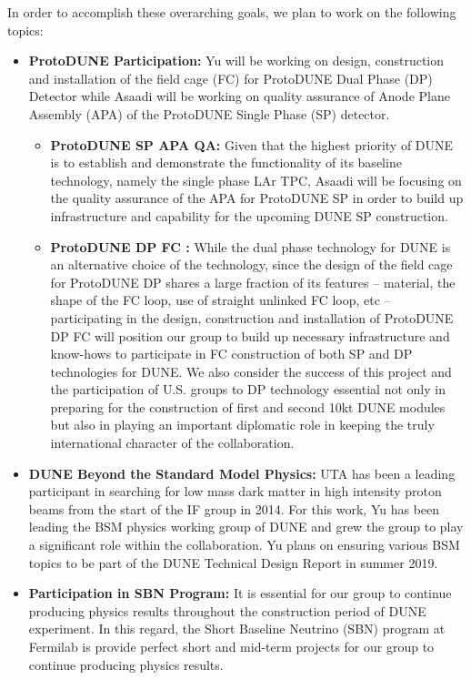In order to accomplish these overarching goals, we plan to work on the following topics:
\begin{itemize}
\item {{\bf ProtoDUNE Participation:} Yu will be working on design, construction and installation of the field cage (FC) for ProtoDUNE Dual Phase (DP) Detector while Asaadi will be working on quality assurance of Anode Plane Assembly (APA) of the ProtoDUNE Single Phase (SP) detector.} 
\begin{itemize}
\item {{\bf ProtoDUNE SP APA QA:} Given that the highest priority of DUNE is to establish and demonstrate the functionality of its baseline technology, namely the single phase LAr TPC, Asaadi will be focusing on the quality assurance of the APA for ProtoDUNE SP in order to build up infrastructure and capability for the upcoming DUNE SP construction.}
\item {{\bf ProtoDUNE DP FC :} While the dual phase technology for DUNE is an alternative choice of the technology, since the design of the field cage for ProtoDUNE DP shares a large fraction of its features – material, the shape of the FC loop, use of straight unlinked FC loop, etc – participating in the design, construction and installation of ProtoDUNE DP FC will position our group to build up necessary infrastructure and know-hows to participate in FC construction of both SP and DP technologies for DUNE.  We also consider the success of this project and the participation of U.S. groups to DP technology essential not only in preparing for the construction of first and second 10kt DUNE modules but also in playing an important diplomatic role in keeping the truly international character of the collaboration.}
\end{itemize}
\item {{\bf DUNE Beyond the Standard Model Physics:} UTA has been a leading participant in searching for low mass dark matter in high intensity proton beams from the start of the IF group in 2014.   For this work, Yu has been leading the BSM physics working group of DUNE and grew the group to play a significant role within the collaboration.   Yu plans on ensuring various BSM topics to be part of the DUNE Technical Design Report in summer 2019.}
\item{{\bf Participation in SBN Program:} It is essential for our group to continue producing physics results throughout the construction period of DUNE experiment.   In this regard, the Short Baseline Neutrino (SBN) program at Fermilab is provide perfect short and mid-term projects for our group to continue producing physics results.}

\end{itemize}
